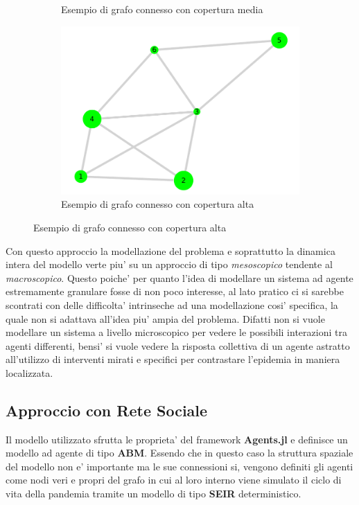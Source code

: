 \begin{figure}[!hb]
\begin{subfigure}[b]{0.3\textwidth}
		\caption{Esempio di grafo connesso con copertura media}
		\label{fig:connected_graph_example_medium}
	\end{subfigure}
	\hfill
	\begin{subfigure}[b]{0.3\textwidth}
		\centering
		\includegraphics[width=\textwidth]{img/plot_6.pdf}
		\caption{Esempio di grafo connesso con copertura alta}
		\label{fig:connected_graph_example_high}
	\end{subfigure}
\end{figure}

Con questo approccio la modellazione del problema e soprattutto la dinamica intera del 
modello verte piu' su un approccio di tipo \emph{mesoscopico} tendente al \emph{macroscopico}.
Questo poiche' per quanto l'idea di modellare un sistema ad agente estremamente granulare fosse 
di non poco interesse, al lato pratico ci si sarebbe scontrati con delle difficolta' 
intrinseche ad una modellazione cosi' specifica, la quale non si adattava all'idea piu' 
ampia del problema. Difatti non si vuole modellare un sistema a livello microscopico per vedere
le possibili interazioni tra agenti differenti, bensi' si vuole vedere la risposta collettiva di un
agente astratto all'utilizzo di interventi mirati e specifici per contrastare l'epidemia in 
maniera localizzata.

\subsection{Approccio con Rete Sociale}
Il modello utilizzato sfrutta le proprieta' del framework \textbf{Agents.jl} e definisce un 
modello ad agente di tipo \textbf{ABM}. Essendo che in questo caso la struttura spaziale 
del modello non e' importante ma le sue connessioni si, vengono definiti gli agenti come nodi
veri e propri del grafo in cui al loro interno viene simulato il ciclo di vita della pandemia 
tramite un modello di tipo \textbf{SEIR} deterministico.

